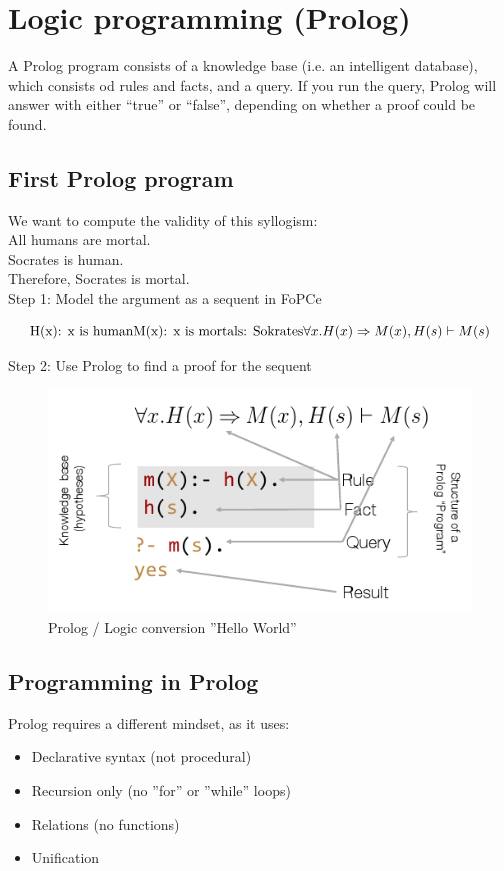 \section{Logic programming (Prolog)}
A Prolog program consists of a knowledge base (i.e. an intelligent database), which consists od rules and facts, and a query.
If you run the query, Prolog will answer with either “true” or “false”, depending on whether a proof could be found.
\subsection{First Prolog program}
We want to compute the validity of this syllogism: \\
All humans are mortal. \\
Socrates is human. \\
Therefore, Socrates is mortal.\\
Step 1: Model the argument as a sequent in FoPCe

\[
\text{H(x): x is human}\\
\text{M(x): x is mortal}\\
\text{s: Sokrates}\\
\forall x.H(x) \Rightarrow M(x),H(s) \vdash M(s)
\]

Step 2: Use Prolog to find a proof for the sequent

\begin{figure}[H]
\centering
\includegraphics[width=0.6\linewidth]{images/prolog_logic_conversion}
\caption{Prolog / Logic conversion ''Hello World''}
\label{fig:prologlogicconversion}
\end{figure}

\subsection{Programming in Prolog}
Prolog requires a different mindset, as it uses:
\begin{itemize}
	\item Declarative syntax (not procedural)
	\item Recursion only (no ''for'' or ''while'' loops)
	\item Relations (no functions)
	\item Unification
\end{itemize}

